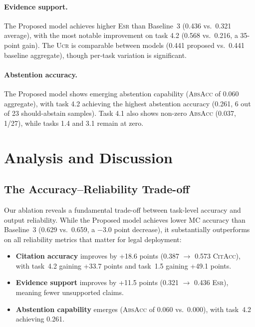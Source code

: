 \documentclass[11pt,a4paper]{article}
\newcommand{\citacc}{\textsc{CitAcc}}
\newcommand{\esr}{\textsc{Esr}}
\newcommand{\ucr}{\textsc{Ucr}}
\newcommand{\absacc}{\textsc{AbsAcc}}
\begin{document}
\paragraph{Evidence support.}
The Proposed model achieves higher \esr{} than Baseline~3 (0.436 vs.\ 0.321 average), with the most notable improvement on task 4.2 (0.568 vs.\ 0.216, a 35-point gain).
The \ucr{} is comparable between models (0.441 proposed vs.\ 0.441 baseline aggregate), though per-task variation is significant.

\paragraph{Abstention accuracy.}
The Proposed model shows emerging abstention capability (\absacc{} of 0.060 aggregate), with task 4.2 achieving the highest abstention accuracy (0.261, 6 out of 23 should-abstain samples).
Task 4.1 also shows non-zero \absacc{} (0.037, 1/27), while tasks 1.4 and 3.1 remain at zero.

\section{Analysis and Discussion}
\label{sec:analysis}

\subsection{The Accuracy--Reliability Trade-off}

Our ablation reveals a fundamental trade-off between task-level accuracy and output reliability.
While the Proposed model achieves lower MC accuracy than Baseline~3 (0.629 vs.\ 0.659, a $-$3.0 point decrease), it substantially outperforms on all reliability metrics that matter for legal deployment:

\begin{itemize}[leftmargin=*, itemsep=2pt]
    \item \textbf{Citation accuracy} improves by +18.6 points (0.387 $\rightarrow$ 0.573 \citacc), with task~4.2 gaining +33.7 points and task~1.5 gaining +49.1 points.
    \item \textbf{Evidence support} improves by +11.5 points (0.321 $\rightarrow$ 0.436 \esr), meaning fewer unsupported claims.
    \item \textbf{Abstention capability} emerges (\absacc{} of 0.060 vs.\ 0.000), with task~4.2 achieving 0.261.
\end{itemize}
\end{document}
